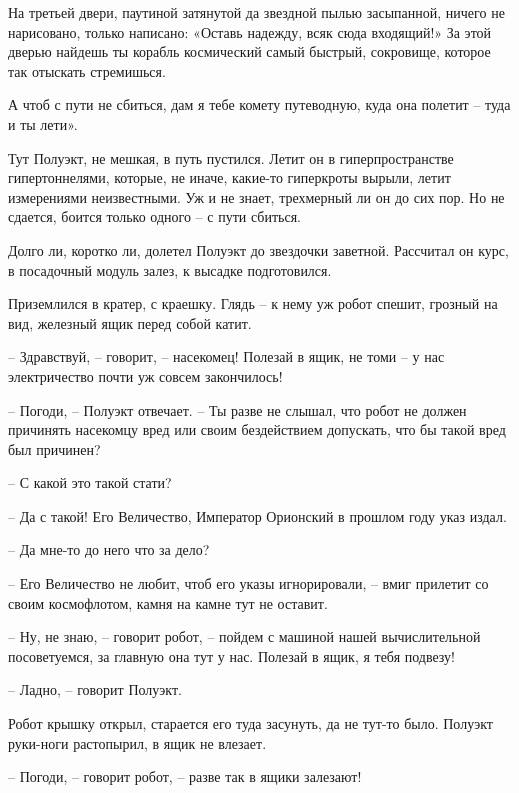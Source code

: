 \documentclass[ebook,oneside,final,openright]{memoir}
\begin{document}
\par
На третьей двери, паутиной затянутой да звездной пылью засыпанной, ничего не нарисовано, только написано: «Оставь надежду, всяк сюда входящий!» За этой дверью найдешь ты корабль космический самый быстрый, сокровище, которое так отыскать стремишься.\par
\par
А чтоб с пути не сбиться, дам я тебе комету путеводную, куда она полетит – туда и ты лети».\par
\par
Тут Полуэкт, не мешкая, в путь пустился. Летит он в гиперпространстве гипертоннелями, которые, не иначе, какие-то гиперкроты вырыли, летит измерениями неизвестными. Уж и не знает, трехмерный ли он до сих пор. Но не сдается, боится только одного – с пути сбиться.\par
\par
Долго ли, коротко ли, долетел Полуэкт до звездочки заветной. Рассчитал он курс, в посадочный модуль залез, к высадке подготовился.\par
\par
Приземлился в кратер, с краешку. Глядь – к нему уж робот спешит, грозный на вид, железный ящик перед собой катит.\par
– Здравствуй, – говорит, – насекомец! Полезай в ящик, не томи – у нас электричество почти уж совсем закончилось!\par
– Погоди, – Полуэкт отвечает. – Ты разве не слышал, что робот не должен причинять насекомцу вред или своим бездействием допускать, что бы такой вред был причинен?\par
– С какой это такой стати?\par
– Да с такой! Его Величество, Император Орионский в прошлом году указ издал.\par
– Да мне-то до него что за дело?\par
– Его Величество не любит, чтоб его указы игнорировали, – вмиг прилетит со своим космофлотом, камня на камне тут не оставит.\par
– Ну, не знаю, – говорит робот, – пойдем с машиной нашей вычислительной посоветуемся, за главную она тут у нас. Полезай в ящик, я тебя подвезу!\par
– Ладно, – говорит Полуэкт.\par
Робот крышку открыл, старается его туда засунуть, да не тут-то было. Полуэкт руки-ноги растопырил, в ящик не влезает. \par
– Погоди, – говорит робот, – разве так в ящики залезают! \par
\end{document}
